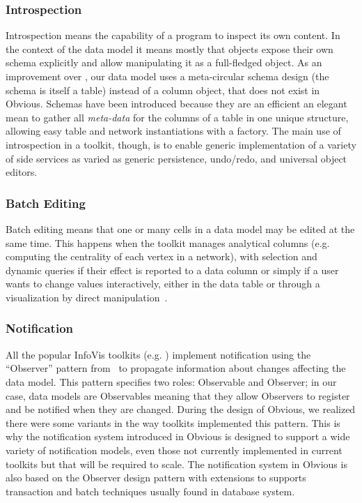 \subsubsection{Introspection}

Introspection means the capability of a program to inspect its own
content. In the context of the data model it means mostly that objects
expose their own schema explicitly and allow manipulating it as a
full-fledged object.  As an improvement over \cite{DesignPatternsIV},
our data model uses a meta-circular schema design (the schema is
itself a table) instead of a column object, that does not exist in
Obvious.  Schemas have been introduced because they are an efficient
an elegant mean to gather all \emph{meta-data} for the columns of a
table in one unique structure, allowing easy table and network
instantiations with a factory.  The main use of introspection in a
toolkit, though, is to enable generic implementation of a variety of
side services as varied as generic persistence, undo/redo, and
universal object editors.

\subsubsection{Batch Editing}

Batch editing means that one or many cells in a data model may be
edited at the same time.  This happens when the toolkit manages
analytical columns (e.g. computing the centrality of each vertex in a
network), with selection and dynamic queries if their effect is
reported to a data column or simply if a user wants to change values
interactively, either in the data table or through a visualization by
direct manipulation~\cite{Discovery3}.

\subsubsection{Notification}

All the popular InfoVis toolkits
(e.g. \cite{Prefuse, InfoVis, jung2003, Discovery1}) implement
notification using the ``Observer'' pattern from~\cite{DesignPatterns}
to propagate information about changes affecting the data model.  This
pattern specifies two roles: Observable and Observer; in our case,
data models are Observables meaning that they allow Observers to
register and be notified when they are changed.  During the design of
Obvious, we realized there were some variants in the way toolkits
implemented this pattern.  This is why the notification system
introduced in Obvious is designed to support a wide variety of
notification models, even those not currently implemented in current
toolkits but that will be required to scale.  The notification system
in Obvious is also based on the Observer design pattern with
extensions to supports transaction and batch techniques usually found
in database system.

